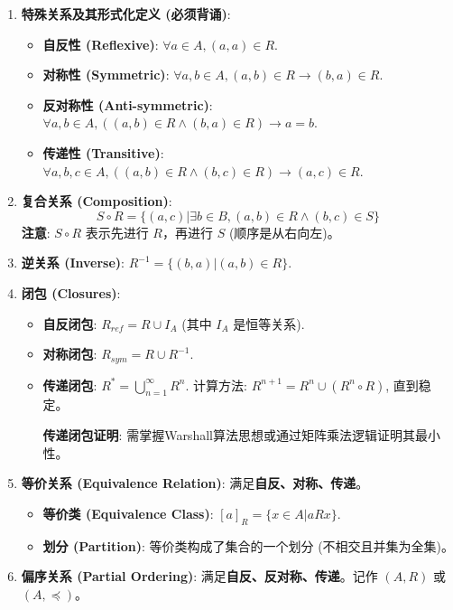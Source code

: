 \documentclass[a4paper,12pt]{ctexart}
\begin{document}
\begin{enumerate}
    \item \textbf{特殊关系及其形式化定义 (必须背诵)}:
    \begin{itemize}
        \item \textbf{自反性 (Reflexive)}: $\forall a \in A, (a, a) \in R$.
        \item \textbf{对称性 (Symmetric)}: $\forall a, b \in A, (a, b) \in R \to (b, a) \in R$.
        \item \textbf{反对称性 (Anti-symmetric)}: $\forall a, b \in A, ((a, b) \in R \land (b, a) \in R) \to a = b$.
        \item \textbf{传递性 (Transitive)}: $\forall a, b, c \in A, ((a, b) \in R \land (b, c) \in R) \to (a, c) \in R$.
    \end{itemize}

    \item \textbf{复合关系 (Composition)}: 
    $$S \circ R = \{ (a, c) | \exists b \in B, (a, b) \in R \land (b, c) \in S \}$$
    \textbf{注意}: $S \circ R$ 表示先进行 $R$，再进行 $S$ (顺序是从右向左)。

    \item \textbf{逆关系 (Inverse)}: $R^{-1} = \{ (b, a) | (a, b) \in R \}$.

    \item \textbf{闭包 (Closures)}:
    \begin{itemize}
        \item \textbf{自反闭包}: $R_{ref} = R \cup I_A$ (其中 $I_A$ 是恒等关系).
        \item \textbf{对称闭包}: $R_{sym} = R \cup R^{-1}$.
        \item \textbf{传递闭包}: $R^* = \bigcup_{n=1}^{\infty} R^n$. 计算方法: $R^{n+1} = R^n \cup (R^n \circ R)$, 直到稳定。
        \begin{mynote}
            \textbf{传递闭包证明}: 需掌握Warshall算法思想或通过矩阵乘法逻辑证明其最小性。
        \end{mynote}
    \end{itemize}

    \item \textbf{等价关系 (Equivalence Relation)}: 满足\textbf{自反、对称、传递}。
    \begin{itemize}
        \item \textbf{等价类 (Equivalence Class)}: $[a]_R = \{ x \in A | aRx \}$.
        \item \textbf{划分 (Partition)}: 等价类构成了集合的一个划分 (不相交且并集为全集)。
    \end{itemize}

    \item \textbf{偏序关系 (Partial Ordering)}: 满足\textbf{自反、反对称、传递}。记作 $(A, R)$ 或 $(A, \preceq)$。
\end{enumerate}
\end{document}
